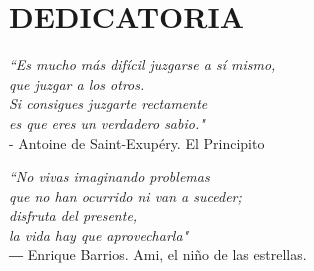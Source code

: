 \chapter*{DEDICATORIA}

\vspace{2cm}

\begin{flushright}
    \textit{
        “Es mucho más difícil juzgarse a sí mismo,\\
        que juzgar a los otros.\\
        Si consigues juzgarte rectamente \\
        es que eres un verdadero sabio."\\
    }
    - Antoine de Saint-Exupéry. El Principito \\
    \vspace{2cm}

    \textit{“No vivas imaginando problemas \\
        que no han ocurrido ni van a suceder; \\
        disfruta del presente, \\
        la vida hay que aprovecharla"\\
    }
    ― Enrique Barrios. Ami, el niño de las estrellas.

\end{flushright}
